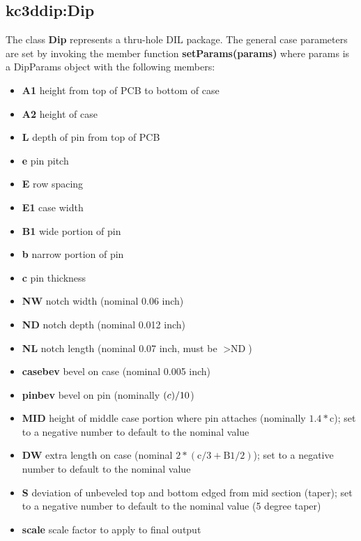 \subsection{kc3ddip:Dip}
The class \textbf{Dip} represents a thru-hole DIL package. The general
case parameters are set by invoking the member function \textbf{setParams(params)} where
params is a DipParams object with the following members:

\begin{itemize}
\item\textbf{A1} height from top of PCB to bottom of case\\
\item\textbf{A2} height of case\\
\item\textbf{L} depth of pin from top of PCB\\
\item\textbf{e} pin pitch\\
\item\textbf{E} row spacing\\
\item\textbf{E1} case width\\
\item\textbf{B1} wide portion of pin\\
\item\textbf{b} narrow portion of pin\\
\item\textbf{c} pin thickness\\
\item\textbf{NW} notch width (nominal 0.06 inch)\\
\item\textbf{ND} notch depth (nominal 0.012 inch)\\
\item\textbf{NL} notch length (nominal 0.07 inch, must be $>\textrm{ND}$)\\
\item\textbf{casebev} bevel on case (nominal 0.005 inch)\\
\item\textbf{pinbev} bevel on pin (nominally $\textrm(c)/10$)\\
\item\textbf{MID} height of middle case portion where pin attaches (nominally $1.4*\textrm{c}$);
    set to a negative number to default to the nominal value\\
\item\textbf{DW} extra length on case (nominal $2*(\textrm{c}/3 + \textrm{B}1/2)$);
    set to a negative number to default to the nominal value\\
\item\textbf{S} deviation of unbeveled top and bottom edged from mid section (taper);
    set to a negative number to default to the nominal value (5 degree taper)\\
\item\textbf{scale} scale factor to apply to final output\\
\end{itemize}


